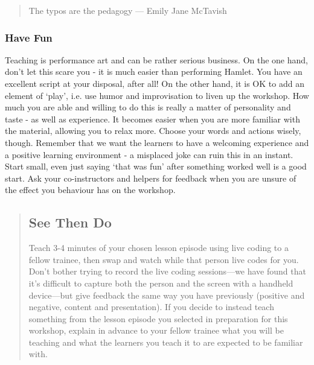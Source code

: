 \begin{quote}   %
The typos are the pedagogy\newline
— Emily Jane McTavish
\end{quote}   %

\subsubsection*{Have Fun}

Teaching is performance art and can be rather serious business.  On
the one hand, don't let this scare you - it is much easier than
performing Hamlet.  You have an excellent script at your disposal,
after all! On the other hand, it is OK to add an element of `play',
i.e.  use humor and improvisation to liven up the workshop.  How much
you are able and willing to do this is really a matter of personality
and taste - as well as experience.  It becomes easier when you are
more familiar with the material, allowing you to relax more.  Choose
your words and actions wisely, though.  Remember that we want the
learners to have a welcoming experience and a positive learning
environment - a misplaced joke can ruin this in an instant.  Start
small, even just saying `that was fun' after something worked well is
a good start.  Ask your co-instructors and helpers for feedback when
you are unsure of the effect you behaviour has on the workshop.

\begin{quotation}   %
\subsection*{See Then Do}

Teach 3-4 minutes of your chosen lesson episode using live coding to a
fellow trainee, then swap and watch while that person live codes for
you.  Don't bother trying to record the live coding sessions---we
have found that it's difficult to capture both the person and the
screen with a handheld device---but give feedback the same way you
have previously (positive and negative, content and presentation).
If you decide to instead teach something from the lesson episode
you selected in preparation for this workshop,
explain in advance to your fellow trainee what you will be teaching
and what the learners you teach it to are expected to be familiar with.
\end{quotation}   %

